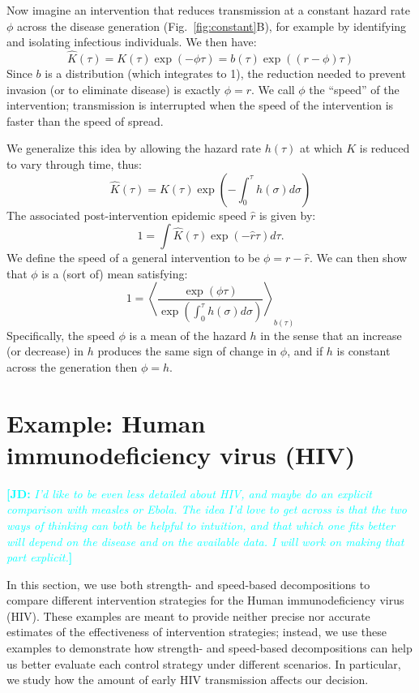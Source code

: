 \documentclass[12pt]{article}
\newcommand{\comment}[3]{\textcolor{#1}{\textbf{[#2: }\textit{#3}\textbf{]}}}
\newcommand{\jd}[1]{\comment{cyan}{JD}{#1}}
\newcommand{\figref}[1]{Fig.~\ref{fig:#1}}
\begin{document}
Now imagine an intervention that reduces transmission at a constant hazard rate $\phi$ across the disease generation (\figref{constant}B), for example by identifying and isolating infectious individuals.
We then have:
\begin{equation}
	\hat K(\tau) = K(\tau)\exp(-\phi\tau) = b(\tau)\exp((r-\phi)\tau)
\end{equation}
Since $b$ is a distribution (which integrates to 1), the reduction needed to prevent invasion (or to eliminate disease)  is exactly $\phi=r$. 
We call $\phi$ the ``speed'' of the intervention; transmission is interrupted when the speed of the intervention is faster than the speed of spread.

We generalize this idea by allowing the hazard rate $h(\tau)$ at which $K$ is reduced to vary through time, thus:
\begin{equation}
	\hat K(\tau) = K(\tau) \exp\left(-\int_0^\tau h(\sigma) d\sigma\right)
\end{equation}
The associated post-intervention epidemic speed $\hat r$ is given by:
\begin{equation}
	1 = \int \hat K(\tau) \exp(-\hat r\tau) d\tau.	
\end{equation}
We define the speed of a general intervention to be $\phi = r - \hat r$. 
We can then show that $\phi$ is a (sort of) mean satisfying:
\begin{equation}
	1 = \left\langle \frac{\exp(\phi \tau) }{\exp\left(\int_0^\tau h(\sigma) d\sigma\right)} \right\rangle_{b(\tau)}
\end{equation}
Specifically, the speed $\phi$ is a mean of the hazard $h$ in the sense that an increase (or decrease) in $h$ produces the same sign of change in $\phi$, and if $h$ is constant across the generation then $\phi=h$.

\section{Example: Human immunodeficiency virus (HIV)}

\jd{I'd like to be even less detailed about HIV, and maybe do an explicit comparison with measles or Ebola. The idea I'd love to get across is that the two ways of thinking can both be helpful to intuition, and that which one fits better will depend on the disease and on the available data. I will work on making that part explicit.}

In this section, we use both strength- and speed-based decompositions to compare different intervention strategies for the Human immunodeficiency virus (HIV). 
These examples are meant to provide neither precise nor accurate estimates of the effectiveness of intervention strategies; 
instead, we use these examples to demonstrate how strength- and speed-based decompositions can help us better evaluate each control strategy under different scenarios.
In particular, we study how the amount of early HIV transmission affects our decision.
\end{document}
